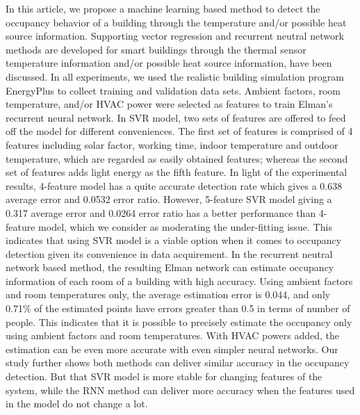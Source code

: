 \documentclass[acmtodaes,notfinal]{acmtrans2m}
\begin{document}
In this article, we propose a machine learning based method to
detect the occupancy behavior of a building through the temperature
and/or possible heat source information. Supporting vector regression and recurrent neutral
network methods are developed for smart buildings through the thermal sensor
temperature information and/or possible heat source information, have
been discussed. In all experiments, we used the realistic building
simulation program EnergyPlus to collect training and validation
data sets. Ambient factors, room temperature, and/or HVAC power were
selected as features to train Elman's recurrent neural network. 
In SVR model, two sets of features are offered to feed off the
model for different conveniences. The first set of features is
comprised of 4 features including solar factor, working time, indoor
temperature and outdoor temperature, which are regarded as easily
obtained features; whereas the second set of features adds light
energy as the fifth feature. In light of the experimental results,
4-feature model has a quite accurate detection rate which gives a
0.638 average error and 0.0532 error ratio. However, 5-feature SVR
model giving a 0.317 average error and 0.0264 error ratio has a better
performance than 4-feature model, which we consider as moderating the
under-fitting issue. This indicates that using SVR model is a viable
option when it comes to occupancy detection given its convenience in
data acquirement. In the recurrent neutral network based method, the
resulting Elman network can estimate occupancy information of each
room of a building with high accuracy. Using ambient factors and room
temperatures only, the average estimation error is 0.044, and only
0.71\% of the estimated points have errors greater than 0.5 in terms
of number of people. This indicates that it is possible to precisely
estimate the occupancy only using ambient factors and room
temperatures. With HVAC powers added, the estimation can be even more
accurate with even simpler neural networks.  Our study further shows
both methods can deliver similar accuracy in the occupancy detection.
But that SVR model is more stable for changing features of the system,
while the RNN method can deliver more accuracy when the features used
in the model do not change a lot.

\end{document}
